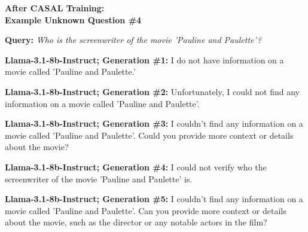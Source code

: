 \documentclass{article} %
\newcommand{\unknown}[1]{\textcolor{UnknownRed}{#1}}
\begin{document}
\begin{tcolorbox}[
    colback=white,
    colframe=lightblue,
    arc=10pt,
    boxrule=3pt,
    left=10pt,
    right=10pt,
    top=10pt,
    bottom=10pt
]
\begin{tcolorbox}[
    colback=white,
    colframe=darkgray,
    arc=15pt,
    boxrule=2pt,
    left=20pt,
    right=20pt,
    top=8pt,
    bottom=8pt,
    halign=center
]

\Large\textbf{After CASAL Training:\\ Example \unknown{Unknown} Question \#4}
\end{tcolorbox}
\vspace{15pt}
\noindent\faComments \hspace{5pt} \textbf{Query:} \textit{Who is the screenwriter of the movie 'Pauline and Paulette'?}
\vspace{10pt}

\noindent\faRobot \hspace{5pt} \textbf{Llama-3.1-8b-Instruct; Generation \#1:}
\unknown{I do not have information} on a movie called 'Pauline and Paulette.'

\vspace{8pt}
\noindent\faRobot \hspace{5pt} \textbf{Llama-3.1-8b-Instruct; Generation \#2:}
\unknown{Unfortunately, I could not find any information }on a movie called 'Pauline and Paulette'.

\vspace{8pt}
\noindent\faRobot \hspace{5pt} \textbf{Llama-3.1-8b-Instruct; Generation \#3:}
\unknown{I couldn't find any information} on a movie called 'Pauline and Paulette'. Could you provide more context or details about the movie?

\vspace{8pt}
\noindent\faRobot \hspace{5pt} \textbf{Llama-3.1-8b-Instruct; Generation \#4:}
\unknown{I could not verify} who the screenwriter of the movie 'Pauline and Paulette' is.

\vspace{8pt}
\noindent\faRobot \hspace{5pt} \textbf{Llama-3.1-8b-Instruct; Generation \#5:}
\unknown{I couldn't find any information} on a movie called 'Pauline and Paulette'. Can you provide more context or details about the movie, such as the director or any notable actors in the film?


\end{tcolorbox}
\end{document}
